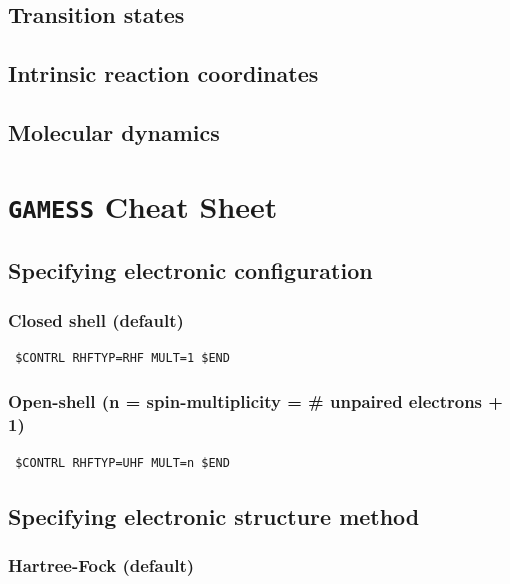 \documentclass[11pt]{article}
\begin{document}
\subsection{Transition states}
\label{sec:org5c62fae}
\subsection{Intrinsic reaction coordinates}
\label{sec:org183c666}
\subsection{Molecular dynamics}
\label{sec:org8b6fdcd}
\newpage

\section{\texttt{GAMESS} Cheat Sheet}
\label{sec:org52115e8}
\subsection{Specifying electronic configuration}
\label{sec:orgc7ea7f4}
\subsubsection{Closed shell (default)}
\label{sec:org7db731b}
\begin{verbatim}
 $CONTRL RHFTYP=RHF MULT=1 $END
\end{verbatim}

\subsubsection{Open-shell (n = spin-multiplicity = \# unpaired electrons + 1)}
\label{sec:org44594f9}
\begin{verbatim}
 $CONTRL RHFTYP=UHF MULT=n $END
\end{verbatim}
\subsection{Specifying electronic structure method}
\label{sec:org895c8d7}
\subsubsection{Hartree-Fock (default)}
\label{sec:org69a4cf0}
\end{document}
